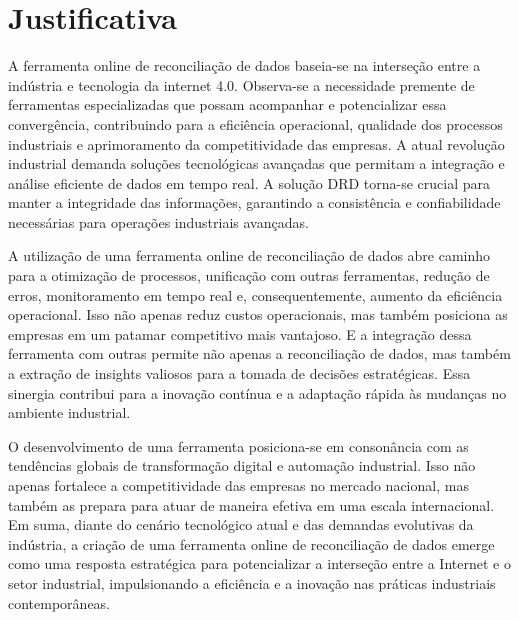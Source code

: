 \section{Justificativa}

A ferramenta online de reconciliação de dados baseia-se na interseção entre a indústria e tecnologia da internet 4.0. Observa-se a necessidade premente de ferramentas especializadas que possam acompanhar e potencializar essa convergência, contribuindo para a eficiência operacional, qualidade dos processos industriais e aprimoramento da competitividade das empresas. A atual revolução industrial demanda soluções tecnológicas avançadas que permitam a integração e análise eficiente de dados em tempo real. A solução DRD torna-se crucial para manter a integridade das informações, garantindo a consistência e confiabilidade necessárias para operações industriais avançadas.

A utilização de uma ferramenta online de reconciliação de dados abre caminho para a otimização de processos, unificação com outras ferramentas, redução de erros, monitoramento em tempo real e, consequentemente, aumento da eficiência operacional. Isso não apenas reduz custos operacionais, mas também posiciona as empresas em um patamar competitivo mais vantajoso. E a integração dessa ferramenta com outras permite não apenas a reconciliação de dados, mas também a extração de insights valiosos para a tomada de decisões estratégicas. Essa sinergia contribui para a inovação contínua e a adaptação rápida às mudanças no ambiente industrial.

O desenvolvimento de uma ferramenta posiciona-se em consonância com as tendências globais de transformação digital e automação industrial. Isso não apenas fortalece a competitividade das empresas no mercado nacional, mas também as prepara para atuar de maneira efetiva em uma escala internacional. Em suma, diante do cenário tecnológico atual e das demandas evolutivas da indústria, a criação de uma ferramenta online de reconciliação de dados emerge como uma resposta estratégica para potencializar a interseção entre a Internet e o setor industrial, impulsionando a eficiência e a inovação nas práticas industriais contemporâneas.



